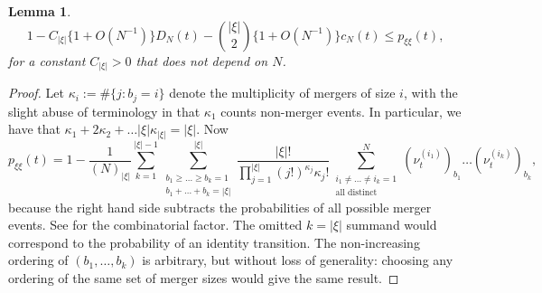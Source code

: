 \documentclass[a4paper,11pt]{article}
\newtheorem{lem}{Lemma}
\theoremstyle{definition}
\newcommand{\1}{\mathds{1}}
\begin{document}
\begin{lem}\label{improved_bounds}
\begin{equation*}
1 - C_{ | \xi |  } \{ 1 + O( N^{ -1 } ) \} D_N( t ) -  \binom{ | \xi | }{ 2 } \{ 1 + O( N^{-1} ) \} c_N( t ) \leq p_{ \xi \xi }( t ),
\end{equation*}
for a constant $C_{ | \xi |  } > 0$ that does not depend on $N$.
\end{lem}
\begin{proof}
Let $\kappa_i := \#\{ j : b_j = i \}$ denote the multiplicity of mergers of size $i$, with the slight abuse of terminology in that $\kappa_1$ counts non-merger events.
In particular, we have that $\kappa_1 + 2 \kappa_2 + \ldots | \xi | \kappa_{ | \xi | } = | \xi |$.
Now
\begin{equation*}
p_{ \xi \xi }( t ) = 1 - \frac{ 1 }{ ( N )_{ | \xi | } } \sum_{ k = 1 }^{ | \xi | - 1 } \sum_{ \substack{ b_1 \geq \ldots \geq b_k = 1 \\ b_1 + \ldots + b_k = | \xi | } }^{ | \xi | } \frac{ | \xi |! }{ \prod_{ j = 1 }^{ | \xi | } ( j ! )^{ \kappa_j } \kappa_j ! } \sum_{ \substack{ i_1 \neq \ldots \neq i_k = 1 \\ \text{all distinct} } }^N( \nu_t^{ ( i_1 ) } )_{ b_1 } \ldots ( \nu_t^{ ( i_k ) } )_{ b_k },
\end{equation*}
because the right hand side subtracts the probabilities of all possible merger events.
See \citep[eq (11)]{Fu06} for the combinatorial factor.
The omitted $k = | \xi |$ summand would correspond to the probability of an identity transition.
The non-increasing ordering of $( b_1, \ldots, b_k )$ is arbitrary, but without loss of generality: choosing any ordering of the same set of merger sizes would give the same result.


\end{proof}
\end{document}

